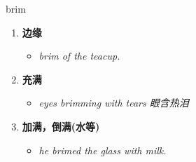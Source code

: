 
\begin{frame}
{\huge brim}
\begin{center}
\begin{enumerate}\Large
  \item \textbf{边缘}
  \begin{itemize}
    \item \em{\Large{brim of the teacup.}}
  \end{itemize}
  \item \textbf{充满}
  \begin{itemize}
    \item \em{\Large{eyes brimming with tears 眼含热泪}}
  \end{itemize}
  \item \textbf{加满，倒满(水等)}
  \begin{itemize}
    \item \em{\Large{he brimed the glass with milk.}}
  \end{itemize}
\end{enumerate}
\end{center}
\end{frame}
